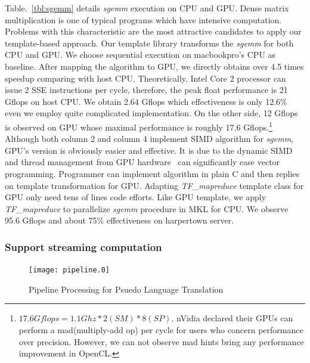 \documentclass[10pt, conference, compsocconf]{IEEEtran}
\begin{document}
Table.~\ref{tbl:sgemm} details \textit{sgemm} execution on CPU and GPU. Dense matrix
multiplication is one of  typical programs which have
intensive computation. Problems with this characteristic are the most
attractive candidates to apply our template-based approach.
Our template library transforms the \textit{sgemm} for both CPU and 
GPU. We choose sequential execution on macbookpro's CPU as
baseline. After mapping the algorithm to GPU, we directly obtains over
4.5 times speedup comparing with host CPU. Theoretically,  Intel Core
2 processor can issue 2 SSE instructions per cycle,  therefore, the
peak float performance is 21 Gflops on host CPU. We obtain 2.64 Gflops which
effectiveness is only 12.6\% even we employ quite complicated
implementation. On the other side, 12 Gflops is observed on GPU whose
maximal performance is roughly 17.6 Gflops.\footnote{$17.6Gflops = 1.1Ghz * 2(SM) *
  8(SP)$. nVidia declared their GPUs can perform a mad(multiply-add
  op) per cycle  for users who concern performance over precision. However, we can
  not observe mad hints bring any performance improvement in OpenCL. }
Although both column 2 and column 4 implement SIMD algorithm for
\textit{sgemm}, GPU's version is obviously easier and effective. It is
due to the dynamic SIMD and thread management from GPU
hardware~\cite{Fatahalian08} can significantly ease vector programming. Programmer can
implement algorithm in plain C and then replies on template
transformation for GPU.  Adapting \emph{TF\_mapreduce} template class
for GPU only need tens of lines code efforts. Like GPU template, we apply
\emph{TF\_mapreduce} to parallelize \textit{sgemm} procedure in MKL
for CPU. We observe 95.6 
Gflops and about 75\% effectiveness on harpertown server.

\subsubsection{Support streaming computation}
\begin{figure}[htp]
\texttt{[image: pipeline.0]}
\caption{Pipeline Processing for Psuedo Language Translation}\label{fig:pipe}
\end{figure}
\end{document}
